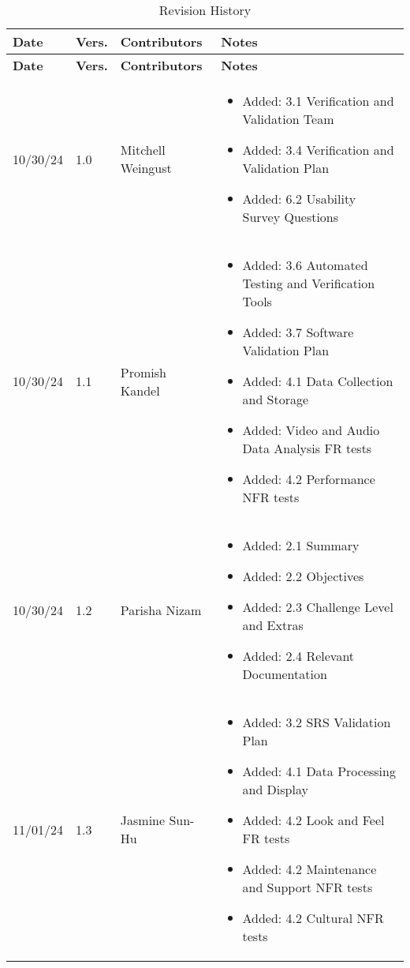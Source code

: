 \documentclass[12pt, titlepage]{article}
\begin{document}
\begin{longtable}{p{2cm}p{1cm}p{4cm}p{8cm}}
\caption{Revision History} \label{TblRevisionHistory} \\
\toprule
\textbf{Date} & \textbf{Vers.} & \textbf{Contributors} & \textbf{Notes} \\
\midrule
\endfirsthead

\toprule
\textbf{Date} & \textbf{Vers.} & \textbf{Contributors} & \textbf{Notes} \\
\midrule
\endhead

10/30/24 & 1.0 & Mitchell Weingust &
\begin{itemize}[noitemsep, topsep=0pt]
  \item Added: 3.1 Verification and Validation Team
  \item Added: 3.4 Verification and Validation Plan
  \item Added: 6.2 Usability Survey Questions
\end{itemize} \\

10/30/24 & 1.1 & Promish Kandel &
\begin{itemize}[noitemsep, topsep=0pt]
  \item Added: 3.6 Automated Testing and Verification Tools
  \item Added: 3.7 Software Validation Plan
  \item Added: 4.1 Data Collection and Storage
  \item Added: Video and Audio Data Analysis FR tests
  \item Added: 4.2 Performance NFR tests
\end{itemize} \\

10/30/24 & 1.2 & Parisha Nizam &
\begin{itemize}[noitemsep, topsep=0pt]
  \item Added: 2.1 Summary
  \item Added: 2.2 Objectives
  \item Added: 2.3 Challenge Level and Extras
  \item Added: 2.4 Relevant Documentation
\end{itemize} \\

11/01/24 & 1.3 & Jasmine Sun-Hu &
\begin{itemize}[noitemsep, topsep=0pt]
  \item Added: 3.2 SRS Validation Plan
  \item Added: 4.1 Data Processing and Display
  \item Added: 4.2 Look and Feel FR tests
  \item Added: 4.2 Maintenance and Support NFR tests
  \item Added: 4.2 Cultural NFR tests
\end{itemize} \\


\end{longtable}
\end{document}
